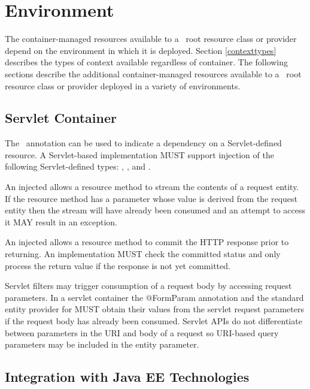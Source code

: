 \chapter{Environment}
\label{environment}

The container-managed resources available to a \jaxrs\ root resource class or provider depend on the environment in which it is deployed. Section \ref{contexttypes} describes the types of context available regardless of container. The following sections describe the additional container-managed resources available to a \jaxrs\ root resource class or provider deployed in a variety of environments.

\section{Servlet Container}
\label{servlet_container}

The \Context\ annotation can be used to indicate a dependency on a Servlet-defined resource. A Servlet-based implementation MUST support injection of the following Servlet-defined types: , ,  and .

An injected  allows a resource method to stream the contents of a request entity. If the resource method has a parameter whose value is derived from the request entity then the stream will have already been consumed and an attempt to access it MAY result in an exception.

An injected  allows a resource method to commit the HTTP response prior to returning. An implementation MUST check the committed status and only process the return value if the response is not yet committed.

Servlet filters may trigger consumption of a request body by accessing request parameters. In a servlet container the @FormParam annotation and the standard entity provider for  MUST obtain their values from the servlet request parameters if the request body has already been consumed. Servlet APIs do not differentiate between parameters in the URI and body of a request so URI-based query parameters may be included in the entity parameter.

\section{Integration with Java EE Technologies}
\label{javaee}

